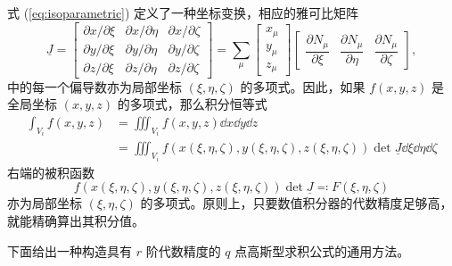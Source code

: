 式 (\ref{eq:isoparametric}) 定义了一种坐标变换，相应的雅可比矩阵
\begin{equation}
\underline{J}=\begin{bmatrix}\partial x/\partial\xi & \partial x/\partial\eta & \partial x/\partial\zeta\\
\partial y/\partial\xi & \partial y/\partial\eta & \partial y/\partial\zeta\\
\partial z/\partial\xi & \partial z/\partial\eta & \partial z/\partial\zeta
\end{bmatrix}=\sum_{\mu}\begin{bmatrix}x_{\mu}\\
y_{\mu}\\
z_{\mu}
\end{bmatrix}\begin{bmatrix}\dfrac{\partial N_{\mu}}{\partial\xi} & \dfrac{\partial N_{\mu}}{\partial\eta} & \dfrac{\partial N_{\mu}}{\partial\zeta}\end{bmatrix},
\end{equation}
中的每一个偏导数亦为局部坐标 $(\xi,\eta,\zeta)$ 的多项式。因此，如果 $f(x,y,z)$ 是全局坐标 $(x,y,z)$
的多项式，那么积分恒等式
\begin{equation}
\begin{aligned}\int_{V_{i}}f(x,y,z) & =\iiint_{V_{i}}f(x,y,z)\dd{x}\dd{y}\dd{z}\\
 & =\iiint_{V_{i}}f(x(\xi,\eta,\zeta),y(\xi,\eta,\zeta),z(\xi,\eta,\zeta))\det\underline{J}\dd{\xi}\dd{\eta}\dd{\zeta}
\end{aligned}
\label{eq:volume_integral}
\end{equation}
右端的被积函数
\begin{equation}
f(x(\xi,\eta,\zeta),y(\xi,\eta,\zeta),z(\xi,\eta,\zeta))\det\underline{J}\eqqcolon F(\xi,\eta,\zeta)
\end{equation}
亦为局部坐标 $(\xi,\eta,\zeta)$ 的多项式。原则上，只要数值积分器的代数精度足够高，就能精确算出其积分值。

下面给出一种构造具有 $r$ 阶代数精度的 $q$ 点高斯型求积公式的通用方法。

